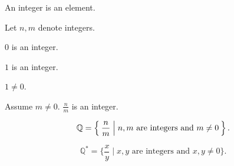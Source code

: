 \documentclass{article}
\begin{document}
  \begin{forthel}

    \begin{signature}
      An integer is an element.
    \end{signature}

    Let $n,m$ denote integers.

    \begin{signature}
      $0$ is an integer.
    \end{signature}

    \begin{signature}
      $1$ is an integer.
    \end{signature}

    \begin{axiom}
      $1 \neq 0$.
    \end{axiom}

    \begin{signature}
      Assume $m \neq 0$.
      $\frac{n}{m}$ is an integer.
    \end{signature}

    \begin{definition}
      \[ \mathbb{Q} = \Set{\frac{n}{m} | \text{$n,m$ are integers and $m \neq 0$}}. \]
    \end{definition}

    \begin{definition}
      \[ \mathbb{Q}^{*} = \{\frac{x}{y} \mid \text{$x,y$ are integers and $x,y \neq 0$}\}. \]
    \end{definition}
  \end{forthel}
\end{document}
